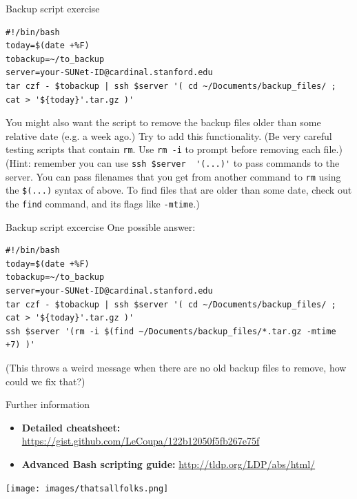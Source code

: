 \documentclass{beamer}
\begin{document}
\begin{frame}[fragile]{Backup script exercise}
\begin{lstlisting}
#!/bin/bash
today=$(date +%F)
tobackup=~/to_backup
server=your-SUNet-ID@cardinal.stanford.edu
tar czf - $tobackup | ssh $server '( cd ~/Documents/backup_files/ ; cat > '${today}'.tar.gz )'
\end{lstlisting}
You might also want the script to remove the backup files older than some relative date (e.g. a week ago.) Try to add this functionality. \alert{(Be very careful testing scripts that contain \lstinline|rm|. Use \lstinline|rm -i| to prompt before removing each file.)} (Hint: remember you can use \lstinline|ssh $server  '(...)'| to pass commands to the server. You can pass filenames that you get from another command to \lstinline|rm| using the \lstinline|$(...)| syntax of above. To find files that are older than some date, check out the \lstinline|find| command, and its flags like \lstinline|-mtime|.)
\end{frame}

\begin{frame}[fragile]{Backup script excercise}
One possible answer:
\begin{lstlisting}[title=backup.sh]
#!/bin/bash
today=$(date +%F)
tobackup=~/to_backup
server=your-SUNet-ID@cardinal.stanford.edu
tar czf - $tobackup | ssh $server '( cd ~/Documents/backup_files/ ; cat > '${today}'.tar.gz )'
ssh $server '(rm -i $(find ~/Documents/backup_files/*.tar.gz -mtime +7) )'
\end{lstlisting}
(This throws a weird message when there are no old backup files to remove, how could we fix that?)
\end{frame}

\begin{frame}{Further information}
\begin{itemize}
\item \textbf{Detailed cheatsheet:} {\color{blue} \url{https://gist.github.com/LeCoupa/122b12050f5fb267e75f}}
\item \textbf{Advanced Bash scripting guide:}  {\color{blue} \url{http://tldp.org/LDP/abs/html/}}
\end{itemize}
\begin{center}
\texttt{[image: images/thatsallfolks.png]}
\end{center}
\end{frame}
\end{document}
